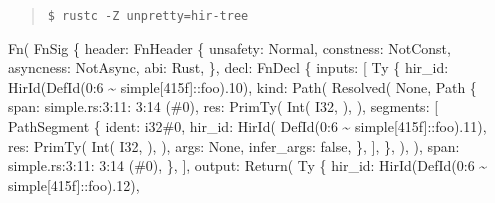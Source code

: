 \documentclass[
  11pt,
  twoside]{report}
\newenvironment{Shaded}{}{}
\newcommand{\NormalTok}[1]{#1}
\begin{document}
\begin{quote}
\texttt{\$\ rustc\ -Z\ unpretty=hir-tree}
\end{quote}

\begin{Shaded}
\begin{Highlighting}[]
\NormalTok{Fn(}
\NormalTok{    FnSig \{}
\NormalTok{        header: FnHeader \{}
\NormalTok{            unsafety: Normal,}
\NormalTok{            constness: NotConst,}
\NormalTok{            asyncness: NotAsync,}
\NormalTok{            abi: Rust,}
\NormalTok{        \},}
\NormalTok{        decl: FnDecl \{}
\NormalTok{            inputs: [}
\NormalTok{                Ty \{}
\NormalTok{                    hir\_id: HirId(DefId(0:6 \textasciitilde{} simple[415f]::foo).10),}
\NormalTok{                    kind: Path(}
\NormalTok{                        Resolved(}
\NormalTok{                            None,}
\NormalTok{                            Path \{}
\NormalTok{                                span: simple.rs:3:11: 3:14 (\#0),}
\NormalTok{                                res: PrimTy(}
\NormalTok{                                    Int(}
\NormalTok{                                        I32,}
\NormalTok{                                    ),}
\NormalTok{                                ),}
\NormalTok{                                segments: [}
\NormalTok{                                    PathSegment \{}
\NormalTok{                                        ident: i32\#0,}
\NormalTok{                                        hir\_id: HirId(}
\NormalTok{                                            DefId(0:6 \textasciitilde{} simple[415f]::foo).11),}
\NormalTok{                                        res: PrimTy(}
\NormalTok{                                            Int(}
\NormalTok{                                                I32,}
\NormalTok{                                            ),}
\NormalTok{                                        ),}
\NormalTok{                                        args: None,}
\NormalTok{                                        infer\_args: false,}
\NormalTok{                                    \},}
\NormalTok{                                ],}
\NormalTok{                            \},}
\NormalTok{                        ),}
\NormalTok{                    ),}
\NormalTok{                    span: simple.rs:3:11: 3:14 (\#0),}
\NormalTok{                \},}
\NormalTok{            ],}
\NormalTok{            output: Return(}
\NormalTok{                Ty \{}
\NormalTok{                    hir\_id: HirId(DefId(0:6 \textasciitilde{} simple[415f]::foo).12),}

\end{Highlighting}
\end{Shaded}
\end{document}
